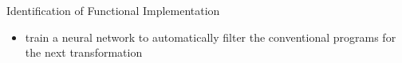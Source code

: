 \documentclass[xcolor=svgnames]{beamer}
\begin{document}
\begin{frame}[t]{Identification of Functional Implementation}
\begin{itemize}
\item train a neural network to automatically filter the conventional programs for the next transformation
\end{itemize}
\end{frame}
\end{document}
